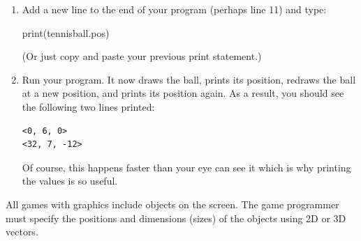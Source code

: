 \begin{enumerate}
	\item Add a new line to the end of your program (perhaps line 11) and type:
	
\begin{myvpython}
print(tennisball.pos)
\end{myvpython}

(Or just copy and paste your previous print statement.)

	\item Run your program. It now draws the ball, prints its position, redraws the ball at a new position, and prints its position again. As a result, you should see the following two lines printed:
	
\begin{verbatim}
<0, 6, 0>
<32, 7, -12>
\end{verbatim}
	
	Of course, this happens faster than your eye can see it which is why printing the values is so useful.

\end{enumerate}

\analysis

All games with graphics include objects on the screen. The game programmer must specify the positions and dimensions (sizes) of the objects using 2D or 3D vectors.

